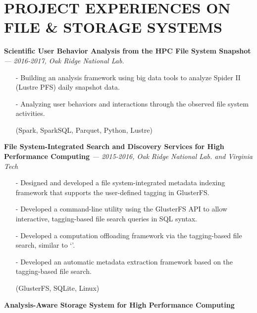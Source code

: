 \section{PROJECT EXPERIENCES ON FILE \& STORAGE SYSTEMS} 
\vspace{0.03in}
  {\bf Scientific User Behavior Analysis from the HPC File System Snapshot}
   {\it \footnotesize --- 2016-2017, Oak Ridge National Lab.}
   \begin{itemize}[leftmargin=*]
    \setlength\itemsep{-0.02in}
    \item[-] Building an analysis framework using big data tools to analyze Spider II (Lustre PFS) daily snapshot data.
    \item[-] Analyzing user behaviors and interactions through the observed file system activities.
    \item[] {\small(Spark, SparkSQL, Parquet, Python, Lustre)}
   \end{itemize}
  \vspace{-0.15in}
  {\bf File System-Integrated Search and Discovery Services for High Performance Computing}
   {\it \footnotesize --- 2015-2016, Oak Ridge National Lab. and Virginia Tech}
   \begin{itemize}[leftmargin=*]
    \setlength\itemsep{-0.02in}
    \item[-] Designed and developed a file system-integrated metadata indexing framework
	     that supports the user-defined tagging in GlusterFS.
    \item[-] Developed a command-line utility using the GlusterFS API to
             allow interactive, tagging-based file search queries in SQL syntax.
    \item[-] Developed a computation offloading framework via the tagging-based file search,
             similar to `'.
    \item[-] Developed an automatic metadata
	     extraction framework based on the tagging-based file search.
    \item[] {\small(GlusterFS, SQLite, Linux)}
   \end{itemize}
  \vspace{-0.15in}
  {\bf Analysis-Aware Storage System for High Performance Computing}
